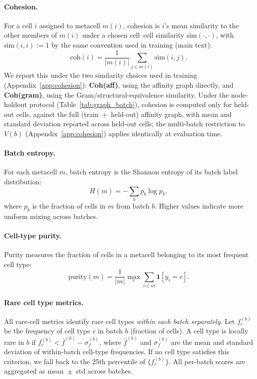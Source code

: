 \paragraph{Cohesion.}
For a cell $i$ assigned to metacell $m(i)$, cohesion is $i$'s mean similarity to the other members of $m(i)$ under a chosen cell--cell similarity $\mathrm{sim}(\cdot,\cdot)$, with $\mathrm{sim}(i,i):=1$ by the same convention used in training (main text):
\begin{equation}
\mathrm{coh}(i) = \frac{1}{|m(i)|}\sum_{j \in m(i)} \mathrm{sim}(i,j).
\end{equation}
We report this under the two similarity choices used in training (Appendix~\ref{app:cohesion}): \textbf{Coh(aff)}, using the affinity graph directly, and \textbf{Coh(gram)}, using the Gram/structural-equivalence similarity. Under the node-holdout protocol (Table~\ref{tab:graph_batch}), cohesion is computed only for held-out cells, against the full (train~+~held-out) affinity graph, with mean and standard deviation reported across held-out cells; the multi-batch restriction to $V(b)$ (Appendix~\ref{app:cohesion}) applies identically at evaluation time.

\paragraph{Batch entropy.}
For each metacell $m$, batch entropy is the Shannon entropy of its batch label distribution:
\begin{equation}
H(m) = -\sum_b p_b \log p_b,
\end{equation}
where $p_b$ is the fraction of cells in $m$ from batch $b$. Higher values indicate more uniform mixing across batches.

\paragraph{Cell-type purity.}
Purity measures the fraction of cells in a metacell belonging to its most frequent cell type:
\begin{equation}
\text{purity}(m) = \frac{1}{|m|} \max_{c} \sum_{i \in m} \mathbf{1}[y_i = c].
\end{equation}

\paragraph{Rare cell type metrics.}
All rare-cell metrics identify rare cell types \emph{within each batch separately}.
Let $f_c^{(b)}$ be the frequency of cell type $c$ in batch $b$ (fraction of cells).
A cell type is locally rare in $b$ if $f_c^{(b)} < \bar{f}^{(b)} - \sigma_f^{(b)}$, where $\bar{f}^{(b)}$ and $\sigma_f^{(b)}$ are the mean and standard deviation of within-batch cell-type frequencies.
If no cell type satisfies this criterion, we fall back to the 25th percentile of $\{f_c^{(b)}\}$.
All per-batch scores are aggregated as mean~$\pm$~std across batches.

